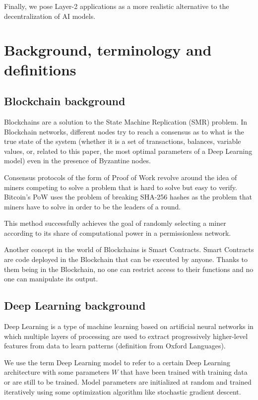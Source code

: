 \documentclass[conference]{IEEEtran}
\begin{document}
Finally, we pose Layer-2 applications as a more realistic alternative to the decentralization of AI models.

\section{Background, terminology and definitions}
\subsection{Blockchain background}
Blockchains are a solution to the State Machine Replication (SMR) problem. In Blockchain networks, different nodes try to reach a consensus as to what is the true state of the system (whether it is a set of transactions, balances, variable values, or, related to this paper, the most optimal parameters of a Deep Learning model) even in the presence of Byzantine nodes.

Consensus protocols of the form of Proof of Work revolve around the idea of miners competing to solve a problem that is hard to solve but easy to verify. Bitcoin's PoW uses the problem of breaking SHA-256 hashes as the problem that miners have to solve in order to be the leaders of a round.

This method successfully achieves the goal of randomly selecting a miner according to its share of computational power in a permissionless network.

Another concept in the world of Blockchains is Smart Contracts. Smart Contracts are code deployed in the Blockchain that can be executed by anyone. Thanks to them being in the Blockchain, no one can restrict access to their functions and no one can manipulate its output.

\subsection{Deep Learning background}
Deep Learning is a type of machine learning based on artificial neural networks in which multiple layers of processing are used to extract progressively higher-level features from data to learn patterns (definition from Oxford Languages).

We use the term Deep Learning model to refer to a certain Deep Learning architecture with some parameters $W$ that have been trained with training data or are still to be trained. Model parameters are initialized at random and trained iteratively using some optimization algorithm like stochastic gradient descent.
\end{document}
